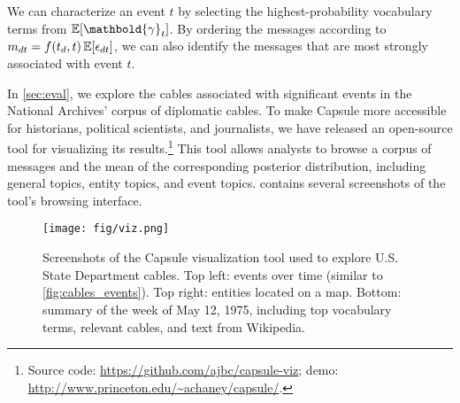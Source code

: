 We can characterize an event $t$ by selecting the highest-probability
vocabulary terms from $\E[\mathbold{\gamma}_t]$. By ordering the
messages according to $m_{dt} = f(t_d, t)\,\mathbb{E}[\epsilon_{dt}]$, we can
also identify the messages that are most strongly associated with
event $t$.

In \cref{sec:eval}, we explore the cables associated with
significant events in the National Archives' corpus of diplomatic
cables. To make Capsule more accessible for historians, political
scientists, and journalists, we have released an open-source tool for
visualizing its results.\footnote{Source code:
  \url{https://github.com/ajbc/capsule-viz}; demo:
  \url{http://www.princeton.edu/~achaney/capsule/}.} This tool allows
analysts to browse a corpus of messages and the mean of the
corresponding posterior distribution, including general topics, entity
topics, and event topics.  contains several screenshots
of the tool's browsing interface.

\begin{figure}
\centering
\texttt{[image: fig/viz.png]}
\caption{Screenshots of the Capsule visualization tool used to explore
  U.S. State Department cables. Top left: events over time (similar to
  \cref{fig:cables_events}). Top right: entities located on a
  map. Bottom: summary of the week of May 12, 1975, including top
  vocabulary terms, relevant cables, and text from Wikipedia.}
\label{fig:viz}
\end{figure}
